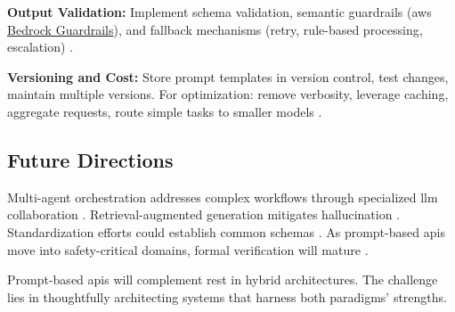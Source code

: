 \textbf{Output Validation:} Implement schema validation, semantic guardrails (\gls{aws} \href{https://aws.amazon.com/bedrock/guardrails/}{Bedrock Guardrails}), and fallback mechanisms (retry, rule-based processing, escalation) \cite{LERCHER_2024, AWS_BEDROCK}.

\textbf{Versioning and Cost:} Store prompt templates in version control, test changes, maintain multiple versions. For optimization: remove verbosity, leverage caching, aggregate requests, route simple tasks to smaller models \cite{SAHOO_2025}.

\subsection{Future Directions}

Multi-agent orchestration addresses complex workflows through specialized \gls{llm} collaboration \cite{SCHLUNTZ_2024}. Retrieval-augmented generation mitigates hallucination \cite{ZHOU_2025}. Standardization efforts could establish common schemas \cite{WHITE_2025}. As prompt-based \gls{api}s move into safety-critical domains, formal verification will mature \cite{AWS_BEDROCK}.

Prompt-based \gls{api}s will complement \gls{rest} in hybrid architectures. The challenge lies in thoughtfully architecting systems that harness both paradigms' strengths.
